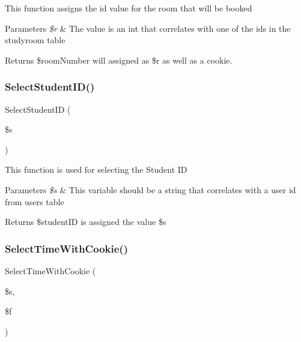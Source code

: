 This function assigns the id value for the room that will be booked 
\begin{DoxyParams}{Parameters}
{\em \$r} & The value is an int that correlates with one of the ids in the studyroom table \\
\hline
\end{DoxyParams}
\begin{DoxyReturn}{Returns}
\$room\+Number will assigned as \$r as well as a cookie. 
\end{DoxyReturn}
\mbox{\label{_room___selection_8class_8php_a1014e84155fb117997cf11fcab3c3d22}} 
\subsubsection{\texorpdfstring{SelectStudentID()}{SelectStudentID()}}
{\footnotesize\ttfamily Select\+Student\+ID (\begin{DoxyParamCaption}\item[{}]{\$s }\end{DoxyParamCaption})}

This function is used for selecting the Student ID 
\begin{DoxyParams}{Parameters}
{\em \$s} & This variable should be a string that correlates with a user id from users table \\
\hline
\end{DoxyParams}
\begin{DoxyReturn}{Returns}
\$student\+ID is assigned the value \$s 
\end{DoxyReturn}
\mbox{\label{_room___selection_8class_8php_a0df97fd941faa49c5932879ede080944}} 
\subsubsection{\texorpdfstring{SelectTimeWithCookie()}{SelectTimeWithCookie()}}
{\footnotesize\ttfamily Select\+Time\+With\+Cookie (\begin{DoxyParamCaption}\item[{}]{\$s,  }\item[{}]{\$f }\end{DoxyParamCaption})}

